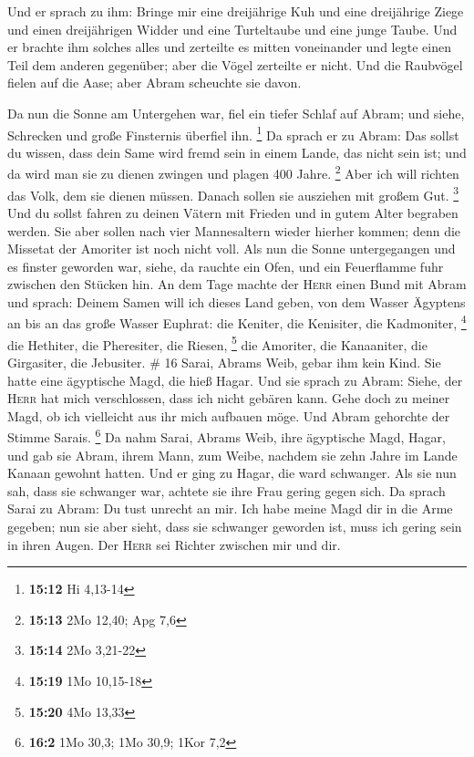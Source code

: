  Und er sprach zu ihm: Bringe mir eine dreijährige Kuh und
eine dreijährige Ziege und einen dreijährigen Widder und eine
Turteltaube und eine junge Taube.  Und er brachte ihm
solches alles und zerteilte es mitten voneinander und legte einen Teil
dem anderen gegenüber; aber die Vögel zerteilte er nicht.
 Und die Raubvögel fielen auf die Aase; aber Abram
scheuchte sie davon.

 Da nun die Sonne am Untergehen war, fiel ein tiefer
Schlaf auf Abram; und siehe, Schrecken und große Finsternis überfiel
ihn. \footnote{\textbf{15:12} Hi 4,13-14}  Da sprach er
zu Abram: Das sollst du wissen, dass dein Same wird fremd sein in einem
Lande, das nicht sein ist; und da wird man sie zu dienen zwingen und
plagen 400 Jahre. \footnote{\textbf{15:13} 2Mo 12,40; Apg 7,6}
 Aber ich will richten das Volk, dem sie dienen müssen.
Danach sollen sie ausziehen mit großem Gut. \footnote{\textbf{15:14} 2Mo
  3,21-22}  Und du sollst fahren zu deinen Vätern mit
Frieden und in gutem Alter begraben werden.  Sie aber
sollen nach vier Mannesaltern wieder hierher kommen; denn die Missetat
der Amoriter ist noch nicht voll.  Als nun die Sonne
untergegangen und es finster geworden war, siehe, da rauchte ein Ofen,
und ein Feuerflamme fuhr zwischen den Stücken hin.  An
dem Tage machte der \textsc{Herr} einen Bund mit Abram und sprach:
Deinem Samen will ich dieses Land geben, von dem Wasser Ägyptens an bis
an das große Wasser Euphrat:  die Keniter, die Kenisiter,
die Kadmoniter, \footnote{\textbf{15:19} 1Mo 10,15-18} 
die Hethiter, die Pheresiter, die Riesen, \footnote{\textbf{15:20} 4Mo
  13,33}  die Amoriter, die Kanaaniter, die Girgasiter,
die Jebusiter. \# 16  Sarai, Abrams Weib, gebar ihm kein
Kind. Sie hatte eine ägyptische Magd, die hieß Hagar.  Und
sie sprach zu Abram: Siehe, der \textsc{Herr} hat mich verschlossen,
dass ich nicht gebären kann. Gehe doch zu meiner Magd, ob ich vielleicht
aus ihr mich aufbauen möge. Und Abram gehorchte der Stimme Sarais.
\footnote{\textbf{16:2} 1Mo 30,3; 1Mo 30,9; 1Kor 7,2}  Da
nahm Sarai, Abrams Weib, ihre ägyptische Magd, Hagar, und gab sie Abram,
ihrem Mann, zum Weibe, nachdem sie zehn Jahre im Lande Kanaan gewohnt
hatten.  Und er ging zu Hagar, die ward schwanger. Als sie
nun sah, dass sie schwanger war, achtete sie ihre Frau gering gegen
sich.  Da sprach Sarai zu Abram: Du tust unrecht an mir.
Ich habe meine Magd dir in die Arme gegeben; nun sie aber sieht, dass
sie schwanger geworden ist, muss ich gering sein in ihren Augen. Der
\textsc{Herr} sei Richter zwischen mir und dir.

